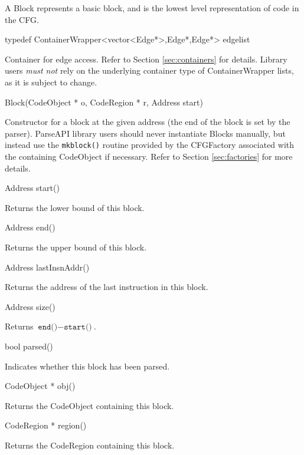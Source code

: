 \documentclass{article}
\newenvironment{apient}{\small\verbatim}{\endverbatim}
\newcommand{\apidesc}[1]{%
{\addtolength{\leftskip}{4em}%
#1\par\medskip}
}
\begin{document}
A Block represents a basic block, and is the lowest level representation of code in the CFG.

\begin{apient}
typedef ContainerWrapper<vector<Edge*>,Edge*,Edge*> edgelist
\end{apient}
\apidesc{Container for edge access. Refer to Section \ref{sec:containers} for details. Library users \emph{must not} rely on the underlying container type of ContainerWrapper lists, as it is subject to change.}


\begin{apient}
Block(CodeObject * o, CodeRegion * r, Address start)
\end{apient}
\apidesc{Constructor for a block at the given address (the end of the block is
set by the parser). ParseAPI library users should never instantiate Blocks
manually, but instead use the \texttt{mkblock()} routine provided by the
CFGFactory associated with the containing CodeObject if necessary. Refer to
Section \ref{sec:factories} for more details.}

\begin{apient}
Address start()
\end{apient}
\apidesc{Returns the lower bound of this block.}

\begin{apient}
Address end()
\end{apient}
\apidesc{Returns the upper bound of this block.}

\begin{apient}
Address lastInsnAddr()
\end{apient}
\apidesc{Returns the address of the last instruction in this block.}

\begin{apient}
Address size()
\end{apient}
\apidesc{Returns $\texttt{end()} - \texttt{start()}$.}

\begin{apient}
bool parsed()
\end{apient}
\apidesc{Indicates whether this block has been parsed.}

\begin{apient}
CodeObject * obj()
\end{apient}
\apidesc{Returns the CodeObject containing this block.}

\begin{apient}
CodeRegion * region()
\end{apient}
\apidesc{Returns the CodeRegion containing this block.}
\end{document}
